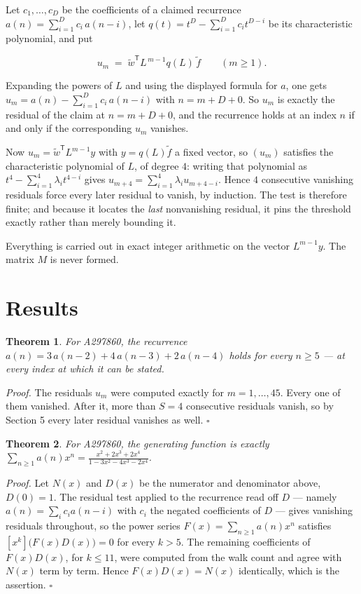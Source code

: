 \documentclass[11pt]{article}
\newtheorem{theorem}{Theorem}
\theoremstyle{definition}
\begin{document}
Let $c_1,\dots,c_D$ be the coefficients of a claimed recurrence $a(n) = \sum_{i=1}^{D} c_i\,a(n-i)$, let $q(t) = t^{D} - \sum_{i=1}^{D} c_i t^{D-i}$ be its characteristic polynomial, and put

\[u_m \;=\; \tilde w^{\mathsf T} L^{\,m-1} q(L)\,\tilde f \qquad (m \ge 1).\]

Expanding the powers of $L$ and using the displayed formula for $a$, one gets $u_m = a(n) - \sum_{i=1}^{D} c_i\,a(n-i)$ with $n = m + D + 0$. So $u_m$ is exactly the residual of the claim at $n = m + D + 0$, and the recurrence holds at an index $n$ if and only if the corresponding $u_m$ vanishes.

Now $u_m = \tilde w^{\mathsf T} L^{m-1} y$ with $y = q(L)\tilde f$ a fixed vector, so $(u_m)$ satisfies the characteristic polynomial of $L$, of degree $4$: writing that polynomial as $t^{4} - \sum_{i=1}^{4} \lambda_i t^{4-i}$ gives $u_{m+4} = \sum_{i=1}^{4} \lambda_i u_{m+4-i}$. Hence $4$ consecutive vanishing residuals force every later residual to vanish, by induction. The test is therefore finite; and because it locates the {\itshape last} nonvanishing residual, it pins the threshold exactly rather than merely bounding it.

Everything is carried out in exact integer arithmetic on the vector $L^{m-1}y$. The matrix $M$ is never formed.

\section{Results}

\begin{theorem} For A297860, the recurrence $a(n) = 3\,a(n-2) + 4\,a(n-3) + 2\,a(n-4)$ holds for every $n \ge 5$ --- at every index at which it can be stated.\end{theorem}

{\itshape Proof.} The residuals $u_m$ were computed exactly for $m = 1,\dots,45$. Every one of them vanished. After it, more than $S = 4$ consecutive residuals vanish, so by Section 5 every later residual vanishes as well. $\square$

\begin{theorem} For A297860, the generating function is exactly $\sum_{n\ge 1} a(n)x^n = \frac{x^{2} + 2x^{3} + 2x^{4}}{1 - 3x^{2} - 4x^{3} - 2x^{4}}$.\end{theorem}

{\itshape Proof.} Let $N(x)$ and $D(x)$ be the numerator and denominator above, $D(0)=1$. The residual test applied to the recurrence read off $D$ --- namely $a(n) = \sum_i c_i a(n-i)$ with $c_i$ the negated coefficients of $D$ --- gives vanishing residuals throughout, so the power series $F(x)=\sum_{n\ge 1}a(n)x^n$ satisfies $[x^k]\bigl(F(x)D(x)\bigr) = 0$ for every $k > 5$. The remaining coefficients of $F(x)D(x)$, for $k \le 11$, were computed from the walk count and agree with $N(x)$ term by term. Hence $F(x)D(x) = N(x)$ identically, which is the assertion. $\square$
\end{document}

